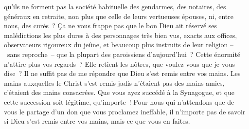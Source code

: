 \documentclass[french,twoside]{book} %
\newcommand{\astertri}{\medskip\par\centerline{\color{rubric}\large\selectfont{\syms ✻\,✻\,✻}}\medskip\par}%
\begin{document}
qu’ils ne forment pas la société habituelle des gendarmes, des notaires, des généraux en retraite, non plus que celle de leurs vertueuses épouses, ni, entre nous, des curés ? Ça ne vous frappe pas que le bon Dieu ait réservé ses malédictions les plus dures à des personnages très bien vus, exacts aux offices, observateurs rigoureux du jeûne, et beaucoup plus instruits de leur religion – sans reproche – que la plupart des paroissiens d’aujourd’hui ? Cette énormité n’attire plus vos regards ? Elle retient les nôtres, que voulez-vous que je vous dise ? Il ne suffit pas de me répondre que Dieu s’est remis entre vos mains. Les mains auxquelles le Christ s’est remis jadis n’étaient pas des mains amies, c’étaient des mains consacrées. Que vous ayez succédé à la Synagogue, et que cette succession soit légitime, qu’importe ! Pour nous qui n’attendons que de vous le partage d’un don que vous proclamez ineffable, il n’importe pas de savoir si Dieu s’est remis entre vos mains, mais ce que vous en faites.\par
 \par

\astertri
\end{document}
